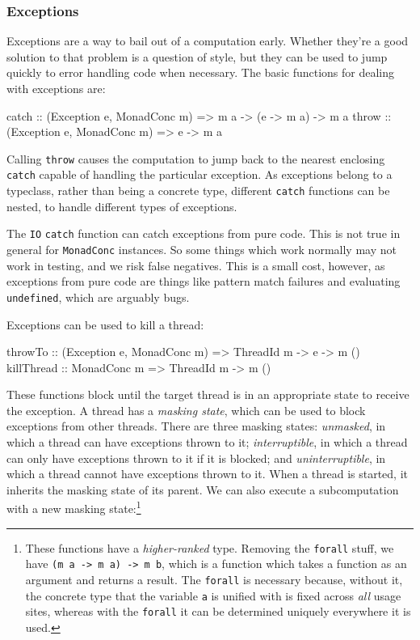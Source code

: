 \subsubsection{Exceptions}
\label{sec:abstraction-typeclass-excs}

Exceptions are a way to bail out of a computation early. Whether
they're a good solution to that problem is a question of style, but
they can be used to jump quickly to error handling code when
necessary. The basic functions for dealing with exceptions are:

\begin{haskellcode}
catch :: (Exception e, MonadConc m) => m a -> (e -> m a) -> m a
throw :: (Exception e, MonadConc m) => e -> m a
\end{haskellcode}

Calling \verb|throw| causes the computation to jump back to the
nearest enclosing \verb|catch| capable of handling the particular
exception. As exceptions belong to a typeclass, rather than being a
concrete type, different \verb|catch| functions can be nested, to
handle different types of exceptions.

\begin{departure}
  The \verb|IO| \verb|catch| function can catch exceptions from pure
  code. This is not true in general for \verb|MonadConc| instances.
  So some things which work normally may not work in testing, and we
  risk false negatives. This is a small cost, however, as exceptions
  from pure code are things like pattern match failures and evaluating
  \verb|undefined|, which are arguably bugs.
\end{departure}

Exceptions can be used to kill a thread:

\begin{haskellcode}
throwTo :: (Exception e, MonadConc m) => ThreadId m -> e -> m ()
killThread :: MonadConc m => ThreadId m -> m ()
\end{haskellcode}

These functions block until the target thread is in an appropriate
state to receive the exception. A thread has a \emph{masking state},
which can be used to block exceptions from other threads. There are
three masking states: \emph{unmasked}, in which a thread can have
exceptions thrown to it; \emph{interruptible}, in which a thread can
only have exceptions thrown to it if it is blocked; and
\emph{uninterruptible}, in which a thread cannot have exceptions
thrown to it. When a thread is started, it inherits the masking state
of its parent. We can also execute a subcomputation with a new masking
state:\footnote{These functions have a \emph{higher-ranked}
  type. Removing the \texttt{forall} stuff, we have \texttt{(m a -> m
    a) -> m b}, which is a function which takes a function as an
  argument and returns a result. The \texttt{forall} is necessary
  because, without it, the concrete type that the variable \texttt{a}
  is unified with is fixed across \emph{all} usage sites, whereas with
  the \texttt{forall} it can be determined uniquely everywhere it is
  used.}

